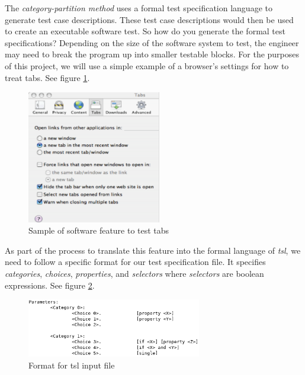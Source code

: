\documentclass[a4full,12pt]{article}
\begin{document}
The \emph{category-partition method} uses a formal test specification language to generate
  test case descriptions. These test case descriptions would then be used to
  create an executable software test. So how do you generate the formal test 
  specifications? Depending on the size of the software system to test, the 
  engineer may need to break the program up into smaller testable blocks. For 
  the purposes of this project, we will use a simple example of a browser's 
  settings for how to treat tabs. See figure \ref{fig:tabs_example}.
\begin{figure}[htb]
\centering
\includegraphics[width=2.3in,keepaspectratio]{images/tabs_example.png}
\caption{Sample of software feature to test tabs}
\label{fig:tabs_example}
\end{figure}

As part of the process to translate this feature into the formal language of \emph{tsl},
  we need to follow a specific format for our test specification file. It specifies
  \emph{categories}, \emph{choices}, \emph{properties}, and \emph{selectors} where 
  \emph{selectors} are boolean expressions. See figure \ref{fig:tsl_format}.
\begin{figure}[htb]
\centering
\includegraphics[width=3in,keepaspectratio]{images/tsl_format.png}
\caption{Format for tsl input file}
\label{fig:tsl_format}
\end{figure}
\end{document}

